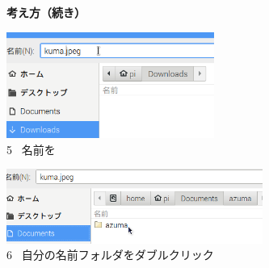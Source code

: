 \documentclass[a4paper,12pt]{jarticle}
\begin{document}
\clearpage
\begin{figure}[t]
  \textbf{考え方（続き）}



  \centering
  \begin{minipage}{\textwidth}
    \begin{minipage}{7.289cm}
      \includegraphics[width=6.8cm,height=3.48cm]{textbook-img097.png}\\
      5 \ 名前を
    \end{minipage}
    \begin{minipage}{1.582cm}
    \end{minipage}
    \begin{minipage}{6.582cm}
      \includegraphics[width=8.375cm,height=2.448cm]{textbook-img098.png}\\
      6 \ 自分の名前フォルダをダブルクリック
    \end{minipage}
  \end{minipage}


  \bigskip


\end{figure}
\end{document}
